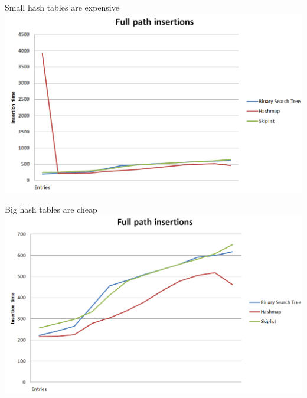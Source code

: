 \documentclass[10pt]{beamer}
\begin{document}
\begin{frame}{Small hash tables are expensive}
    \centering
    \includegraphics[width=\textwidth]{hashtable_bad.png}
\end{frame}

\begin{frame}{Big hash tables are cheap}
    \centering
    \includegraphics[width=\textwidth]{hashtable_good.png}
\end{frame}
\end{document}
